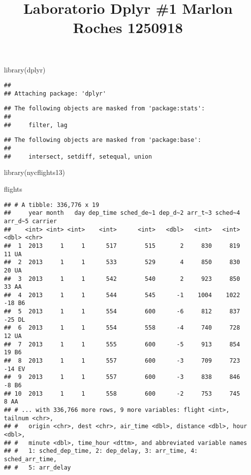 \documentclass[
]{article}
\title{Laboratorio Dplyr \#1 Marlon Roches 1250918}
\author{}
\date{\vspace{-2.5em}}
\newenvironment{Shaded}{\begin{snugshade}}{\end{snugshade}}
\newcommand{\FunctionTok}[1]{\textcolor[rgb]{0.00,0.00,0.00}{#1}}
\newcommand{\NormalTok}[1]{#1}
\begin{document}
\maketitle

\begin{Shaded}
\begin{Highlighting}[]
  \FunctionTok{library}\NormalTok{(dplyr)}
\end{Highlighting}
\end{Shaded}

\begin{verbatim}
## 
## Attaching package: 'dplyr'
\end{verbatim}

\begin{verbatim}
## The following objects are masked from 'package:stats':
## 
##     filter, lag
\end{verbatim}

\begin{verbatim}
## The following objects are masked from 'package:base':
## 
##     intersect, setdiff, setequal, union
\end{verbatim}

\begin{Shaded}
\begin{Highlighting}[]
  \FunctionTok{library}\NormalTok{(nycflights13)}
\end{Highlighting}
\end{Shaded}

\begin{Shaded}
\begin{Highlighting}[]
\NormalTok{  flights}
\end{Highlighting}
\end{Shaded}

\begin{verbatim}
## # A tibble: 336,776 x 19
##     year month   day dep_time sched_de~1 dep_d~2 arr_t~3 sched~4 arr_d~5 carrier
##    <int> <int> <int>    <int>      <int>   <dbl>   <int>   <int>   <dbl> <chr>  
##  1  2013     1     1      517        515       2     830     819      11 UA     
##  2  2013     1     1      533        529       4     850     830      20 UA     
##  3  2013     1     1      542        540       2     923     850      33 AA     
##  4  2013     1     1      544        545      -1    1004    1022     -18 B6     
##  5  2013     1     1      554        600      -6     812     837     -25 DL     
##  6  2013     1     1      554        558      -4     740     728      12 UA     
##  7  2013     1     1      555        600      -5     913     854      19 B6     
##  8  2013     1     1      557        600      -3     709     723     -14 EV     
##  9  2013     1     1      557        600      -3     838     846      -8 B6     
## 10  2013     1     1      558        600      -2     753     745       8 AA     
## # ... with 336,766 more rows, 9 more variables: flight <int>, tailnum <chr>,
## #   origin <chr>, dest <chr>, air_time <dbl>, distance <dbl>, hour <dbl>,
## #   minute <dbl>, time_hour <dttm>, and abbreviated variable names
## #   1: sched_dep_time, 2: dep_delay, 3: arr_time, 4: sched_arr_time,
## #   5: arr_delay
\end{verbatim}
\end{document}
